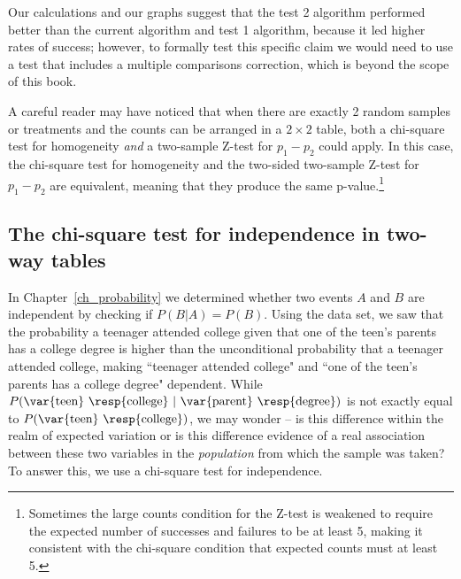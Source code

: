 Our calculations and our graphs suggest that the test 2 algorithm performed better than the current algorithm and test 1 algorithm, because it led higher rates of success; however, to formally test this specific claim we would need to use a test that includes a multiple comparisons correction, which is beyond the scope of this book.

A careful reader may have noticed that when there are exactly 2 random samples or treatments and the counts can be arranged in a $2\times 2$ table, both a chi-square test for homogeneity \emph{and} a two-sample Z-test for $p_1 - p_2$ could apply.   In this case, the chi-square test for homogeneity and the two-sided two-sample Z-test for $p_1 - p_2$ are equivalent, meaning that they produce the same p-value.\footnote{Sometimes the large counts condition for the Z-test is weakened to require the expected number of successes and failures to be at least 5, making it consistent with the chi-square condition that expected counts must at least 5.}






\D{\newpage}

\subsection{The chi-square test for independence in two-way tables}

In Chapter~\ref{ch_probability} we determined whether two events $A$ and $B$ are independent by checking if $P(B | A ) = P(B)$.  Using the  data set, we saw that the probability a teenager attended college given that one of the teen's parents has a college degree is higher than the unconditional probability that a teenager attended college, making ``teenager attended college" and ``one of the teen's parents has a college degree" dependent.  While $P(\text{\var{teen} \resp{college}}\ |\ \text{\var{parent} \resp{degree}})$ is not exactly equal to $P(\text{\var{teen} \resp{college}})$, we may wonder -- is this difference within the realm of expected variation or is this difference evidence of a real association between these two variables in the \emph{population} from which the sample was taken?  To answer this, we use a chi-square test for independence.

